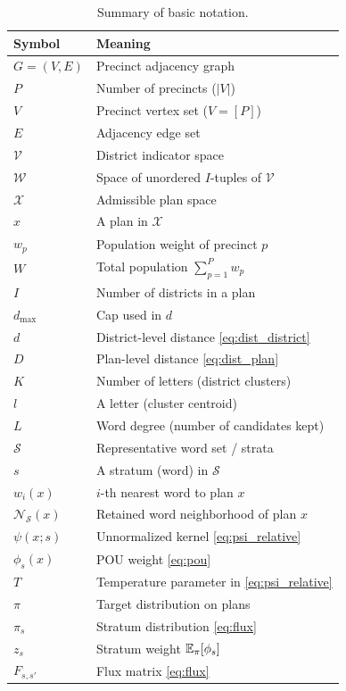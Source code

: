 \begin{table}[!htbp]
    \centering
    \small
\renewcommand{\arraystretch}{1.1}
\begin{tabular}{ll}
    \hline
    Symbol & Meaning \\
    \hline
    $G=(V,E)$ & Precinct adjacency graph \\
    $P$ & Number of precincts ($|V|$) \\
    $V$ & Precinct vertex set ($V=[P]$) \\
    $E$ & Adjacency edge set \\
    $\mathcal{V}$ & District indicator space \\
    $\mathcal{W}$ & Space of unordered $I$-tuples of $\mathcal{V}$ \\
    $\mathcal{X}$ & Admissible plan space \\
    $x$ & A plan in $\mathcal{X}$ \\
    $w_p$ & Population weight of precinct $p$ \\
    $W$ & Total population $\sum_{p=1}^P w_p$ \\
    $I$ & Number of districts in a plan \\
    $d_{\max}$ & Cap used in $d$ \\
    $d$ & District-level distance \eqref{eq:dist_district} \\
    $D$ & Plan-level distance \eqref{eq:dist_plan} \\
    $K$ & Number of letters (district clusters) \\
    $l$ & A letter (cluster centroid) \\
    $L$ & Word degree (number of candidates kept) \\
    $\mathcal{S}$ & Representative word set / strata \\
    $s$ & A stratum (word) in $\mathcal{S}$ \\
    $w_i(x)$ & $i$-th nearest word to plan $x$ \\
    $\mathcal{N}_{\mathcal{S}}(x)$ & Retained word neighborhood of plan $x$ \\
    $\psi(x;s)$ & Unnormalized kernel \eqref{eq:psi_relative} \\
    $\phi_s(x)$ & POU weight \eqref{eq:pou} \\
    $T$ & Temperature parameter in \eqref{eq:psi_relative} \\
    $\pi$ & Target distribution on plans \\
    $\pi_s$ & Stratum distribution \eqref{eq:flux} \\
    $z_s$ & Stratum weight $\mathbb{E}_{\pi}[\phi_s]$ \\
    $F_{s,s'}$ & Flux matrix \eqref{eq:flux} \\
    \hline
\end{tabular}
\caption{Summary of basic notation.}
\label{tab:notation}
\end{table}
